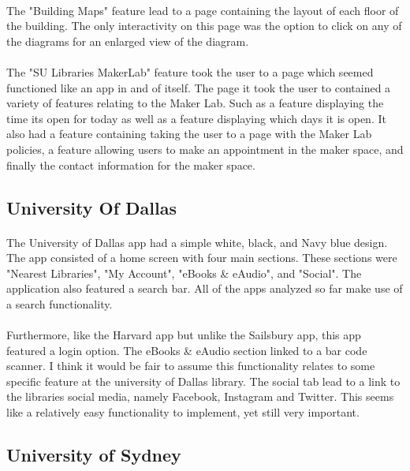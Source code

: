             \paragraph{}
            The "Building Maps" feature lead to a page containing the layout of each floor of the building. The only interactivity on this page was the option to click on any of the diagrams for an enlarged view of the diagram. 
            \paragraph{}
            The "SU Libraries MakerLab" feature took the user to a page which seemed functioned like an app in and of itself. The page it took the user to contained a variety of features relating to the Maker Lab. Such as a feature displaying the time its open for today as well as a feature displaying which days it is open. It also had a feature containing taking the user to a page with the Maker Lab policies, a feature allowing users to make an appointment in the maker space, and finally the contact information for the maker space. 
        \subsection{University Of Dallas}
            \paragraph{}
            The University of Dallas app had a simple white, black, and Navy blue design. The app consisted of a home screen with four main sections. These sections were "Nearest Libraries", "My Account", "eBooks & eAudio", and "Social". The application also featured a search bar. All of the apps analyzed so far make use of a search functionality. 
            \paragraph{}
            Furthermore, like the Harvard app but unlike the Sailsbury app, this app featured a login option. The eBooks & eAudio section linked to a bar code scanner. I think it would be fair to assume this functionality relates to some specific feature at the university of Dallas library. The social tab lead to a link to the libraries social media, namely Facebook, Instagram and Twitter. This seems like a relatively easy functionality to implement, yet still very important. 
        \subsection{University of Sydney}
